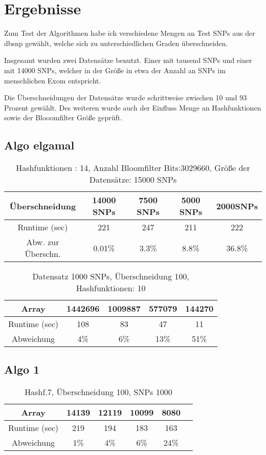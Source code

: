 \chapter{Ergebnisse}

Zum Test der Algorithmen habe ich verschiedene Mengen an Test SNPs aus der dbsnp gewählt, welche sich zu unterschiedlichen Graden überschneiden.

Insgesamt wurden zwei Datensätze benutzt. Einer mit tausend SNPs und einer mit 14000 SNPs, welcher in der Größe in etwa der Anzahl an SNPs im menschlichen Exom entspricht.

Die Überschneidungen der Datensätze wurde schrittweise zwischen 10 und 93 Prozent gewählt.
Des weiteren wurde auch der Einfluss Menge an Hashfunktionen sowie der Blooomfilter Größe geprüft.



\section{Algo elgamal}

 \begin{table}[h]
 	\begin{tabular}{c|c|c|c|c}
 		Überschneidung&14000 SNPs&7500 SNPs&5000 SNPs&2000SNPs\\
 		\hline
 		Runtime (sec)& 221&247&211&222\\
 		Abw. zur Überschn.& 0.01\%& 3.3\%&8.8\%&36.8\%\\
 		
 	\end{tabular}
 	\caption{Hashfunktionen : 14, Anzahl Bloomfilter Bits:3029660, Größe der Datensätze: 15000 SNPs }
 	\label{tab:meinetabelle1}
 	
 	
 \end{table}
 
 \begin{table}[h]
 	
 	
 	\begin{tabular}{c|c|c|c|c}
 		Array& 1442696&1009887&577079&144270\\
 		\hline
 		Runtime (sec)& 108&83&47&11\\
 		Abweichung&4\%&6\%&13\%&51\%\\
 		
 		
 	\end{tabular}
 	\caption{Datensatz 1000 SNPs, Überschneidung 100, Hashfunktionen: 10 }
 	\label{tab:meinetabelle2}
 \end{table}
 
\section{Algo 1}

	\begin{table}[h]
		
		\begin{tabular}{c|c|c|c|c|c}
			Array&14139&12119&10099&8080\\
			\hline
			Runtime (sec)&219&194&183&163\\
			Abweichung&1\%&4\%&6\%&24\%\\
			
			
		\end{tabular}
		\caption{Hashf.7, Überschneidung 100, SNPs 1000 }
		\label{tab:meinetabelle5}
	\end{table}